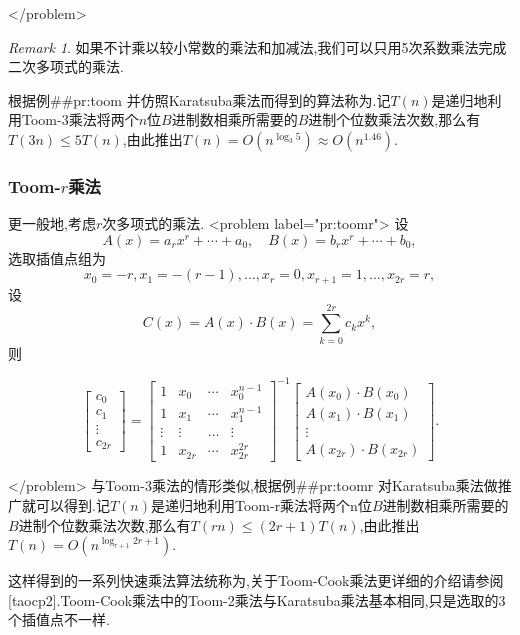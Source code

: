 \documentclass{ctexart}
\newcommand\mtcasCite[1]{[#1]}
\theoremstyle{remark}
\newtheorem{remark}{Remark}
\theoremstyle{definition}
\begin{document}
</problem>
\begin{remark}
如果不计乘以较小常数的乘法和加减法,我们可以只用5次系数乘法完成二次多项式的乘法.
\end{remark}
根据例##pr:toom 并仿照Karatsuba乘法而得到的算法称为.记$T(n)$是递归地利用Toom-3乘法将两个$n$位$B$进制数相乘所需要的$B$进制个位数乘法次数,那么有$T(3n)\le 5T(n)$,由此推出$T(n)=O(n^{\log_3{5}})\approx O(n^{1.46})$.

\subsubsection{Toom-$r$乘法}

更一般地,考虑$r$次多项式的乘法.
<problem label="pr:toomr">
设$$A(x)=a_rx^r+\cdots+a_0,\quad B(x)=b_rx^r+\cdots+b_0,$$选取插值点组为$$x_0=-r,x_1=-(r-1),\ldots,x_r=0,x_{r+1}=1,\ldots,x_{2r}=r,$$设$$C(x)=A(x)\cdot B(x)=\sum_{k=0}^{2r}c_kx^k,$$则

\begin{equation*}
  \begin{bmatrix}
    c_0\\
    c_1\\
    \vdots\\
    c_{2r}
  \end{bmatrix}
=
  \begin{bmatrix}
    1 & x_0 & \cdots & x_0^{n-1}\\
    1 & x_1 & \cdots & x_1^{n-1}\\
    \vdots & \vdots & \ldots & \vdots\\
    1 & x_{2r} & \cdots & x_{2r}^{2r}
  \end{bmatrix}
^{-1}
  \begin{bmatrix}
    A(x_0)\cdot B(x_0)\\
    A(x_1)\cdot B(x_1)\\
    \vdots\\
    A(x_{2r})\cdot B(x_{2r})
  \end{bmatrix}.
\end{equation*}

</problem>
与Toom-3乘法的情形类似,根据例##pr:toomr 对Karatsuba乘法做推广就可以得到.记$T(n)$是递归地利用Toom-r乘法将两个n位$B$进制数相乘所需要的$B$进制个位数乘法次数,那么有$T(rn)\le (2r+1)T(n)$,由此推出$T(n)=O(n^{\log_{r+1}{2r+1}})$.

这样得到的一系列快速乘法算法统称为,关于Toom-Cook乘法更详细的介绍请参阅\mtcasCite{taocp2}.Toom-Cook乘法中的Toom-2乘法与Karatsuba乘法基本相同,只是选取的3个插值点不一样.
\end{document}
